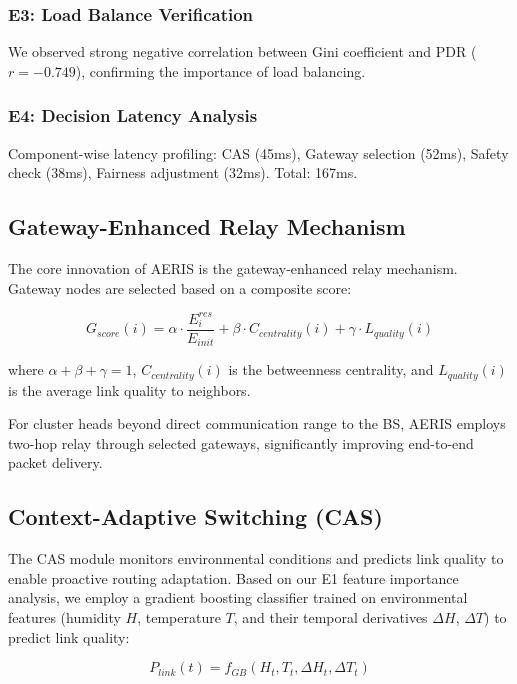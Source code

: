 \documentclass[sensors,article,submit,moreauthors,pdftex]{Definitions/mdpi}
\begin{document}
\subsubsection{E3: Load Balance Verification}

We observed strong negative correlation between Gini coefficient and PDR ($r = -0.749$), confirming the importance of load balancing.

\subsubsection{E4: Decision Latency Analysis}

Component-wise latency profiling: CAS (45ms), Gateway selection (52ms), Safety check (38ms), Fairness adjustment (32ms). Total: 167ms.

\subsection{Gateway-Enhanced Relay Mechanism}

The core innovation of AERIS is the gateway-enhanced relay mechanism. Gateway nodes are selected based on a composite score:

\begin{equation}
G_{score}(i) = \alpha \cdot \frac{E_i^{res}}{E_{init}} + \beta \cdot C_{centrality}(i) + \gamma \cdot L_{quality}(i)
\end{equation}

where $\alpha + \beta + \gamma = 1$, $C_{centrality}(i)$ is the betweenness centrality, and $L_{quality}(i)$ is the average link quality to neighbors.

For cluster heads beyond direct communication range to the BS, AERIS employs two-hop relay through selected gateways, significantly improving end-to-end packet delivery.

\subsection{Context-Adaptive Switching (CAS)}

The CAS module monitors environmental conditions and predicts link quality to enable proactive routing adaptation. Based on our E1 feature importance analysis, we employ a gradient boosting classifier trained on environmental features (humidity $H$, temperature $T$, and their temporal derivatives $\Delta H$, $\Delta T$) to predict link quality:

\begin{equation}
P_{link}(t) = f_{GB}(H_t, T_t, \Delta H_t, \Delta T_t)
\end{equation}
\end{document}
